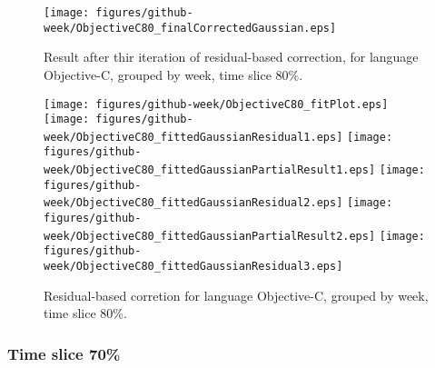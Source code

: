 \begin{figure}[]
\centering
{\texttt{[image: figures/github-week/ObjectiveC80\_finalCorrectedGaussian.eps]}}
\caption{Result after thir iteration of residual-based correction, for language Objective-C, grouped by week, time slice 80\%.}
\end{figure}


\begin{figure}[hb]
\centering
{}
{\texttt{[image: figures/github-week/ObjectiveC80\_fitPlot.eps]}}
{\texttt{[image: figures/github-week/ObjectiveC80\_fittedGaussianResidual1.eps]}}
{\texttt{[image: figures/github-week/ObjectiveC80\_fittedGaussianPartialResult1.eps]}}
{\texttt{[image: figures/github-week/ObjectiveC80\_fittedGaussianResidual2.eps]}}
{\texttt{[image: figures/github-week/ObjectiveC80\_fittedGaussianPartialResult2.eps]}}
{\texttt{[image: figures/github-week/ObjectiveC80\_fittedGaussianResidual3.eps]}}
\caption{Residual-based corretion for language Objective-C, grouped by week, time slice 80\%.}
\end{figure}


\clearpage 
\newpage 


\FloatBarrier

\subsubsection{Time slice 70\%}


